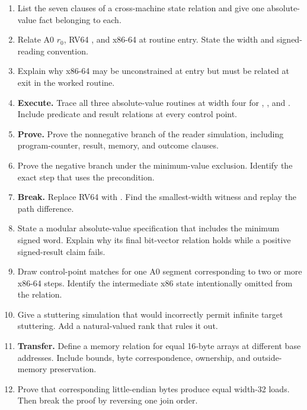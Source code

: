 \begin{enumerate}
\item List the seven clauses of a cross-machine state relation and give one
absolute-value fact belonging to each.

\item Relate A0 \(r_0\), RV64 , and x86-64  at routine
entry. State the width and signed-reading convention.

\item Explain why x86-64  may be unconstrained at entry but must be
related at exit in the worked routine.

\item \textbf{Execute.} Trace all three absolute-value routines at width four
for , , and . Include predicate and result
relations at every control point.

\item \textbf{Prove.} Prove the nonnegative branch of the reader simulation,
including program-counter, result, memory, and outcome clauses.

\item Prove the negative branch under the minimum-value exclusion. Identify
the exact step that uses the precondition.

\item \textbf{Break.} Replace RV64  with . Find the
smallest-width witness and replay the path difference.

\item State a modular absolute-value specification that includes the minimum
signed word. Explain why its final bit-vector relation holds while a positive
signed-result claim fails.

\item Draw control-point matches for one A0 segment corresponding to two or
more x86-64 steps. Identify the intermediate x86 state intentionally omitted
from the relation.

\item Give a stuttering simulation that would incorrectly permit infinite
target stuttering. Add a natural-valued rank that rules it out.

\item \textbf{Transfer.} Define a memory relation for equal 16-byte arrays at
different base addresses. Include bounds, byte correspondence, ownership, and
outside-memory preservation.

\item Prove that corresponding little-endian bytes produce equal width-32
loads. Then break the proof by reversing one join order.


\end{enumerate}
